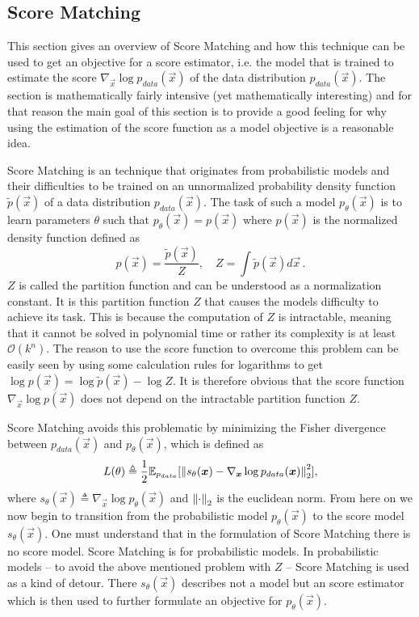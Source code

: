 \subsection{Score Matching} \label{sec:3.1.1}
This section gives an overview of Score Matching and how this technique can be used to get an objective for a score estimator, i.e. the model that is trained to estimate the score $\nabla_{\vec{x}}\log p_{data}(\vec{x})$ of the data distribution $p_{data}(\vec{x})$. The section is mathematically fairly intensive (yet mathematically interesting) and for that reason the main goal of this section is to provide a good feeling for why using the estimation of the score function as a model objective is a reasonable idea.

Score Matching \cite{score_matching_original} is an technique that originates from probabilistic models and their difficulties to be trained on an unnormalized probability density function $\tilde{p}(\vec{x})$ of a data distribution $p_{data}(\vec{x})$. The task of such a model $p_\theta(\vec{x})$ is to learn parameters $\theta$ such that $p_\theta(\vec{x})=p(\vec{x})$ where $p(\vec{x})$ is the normalized density function defined as
%
\begin{equation}
    p(\vec{x})=\frac{\tilde{p}(\vec{x})}{Z},\quad Z=\int\tilde{p}(\vec{x})d\vec{x}\,.
\end{equation}
%
$Z$ is called the partition function and can be understood as a normalization constant. It is this partition function $Z$ that causes the models difficulty to achieve its task. This is because the computation of $Z$ is intractable, meaning that it cannot be solved in polynomial time or rather its complexity is at least $\mathcal{O}(k^n)$. The reason to use the score function to overcome this problem can be easily seen by using some calculation rules for logarithms to get $\log p(\vec{x})=\log\tilde{p}(\vec{x})-\log Z$. It is therefore obvious that the score function $\nabla_{\vec{x}}\log p(\vec{x})$ does not depend on the intractable partition function $Z$.

Score Matching avoids this problematic by minimizing the Fisher divergence between $p_{data}(\vec{x})$ and $p_\theta(\vec{x})$, which is defined as
%
\begin{equation} \label{equ:3.2}
    L(\theta)\triangleq\frac{1}{2}\mathbb{E}_{p_{data}}[\left\lVert s_\theta(\boldsymbol{x})-\nabla_{\boldsymbol{x}}\log p_{data}(\boldsymbol{x})\right\rVert^2_2],
\end{equation}
%
where $s_\theta(\vec{x})\triangleq\nabla_{\vec{x}}\log p_\theta(\vec{x})$ and $\left\lVert\cdot\right\rVert_2$ is the euclidean norm. From here on we now begin to transition from the probabilistic model $p_\theta(\vec{x})$ to the score model $s_\theta(\vec{x})$. One must understand that in the formulation of Score Matching there is no score model. Score Matching is for probabilistic models. In probabilistic models – to avoid the above mentioned problem with $Z$ – Score Matching is used as a kind of detour. There $s_\theta(\vec{x})$ describes not a model but an score estimator which is then used to further formulate an objective for $p_\theta(\vec{x})$. 

